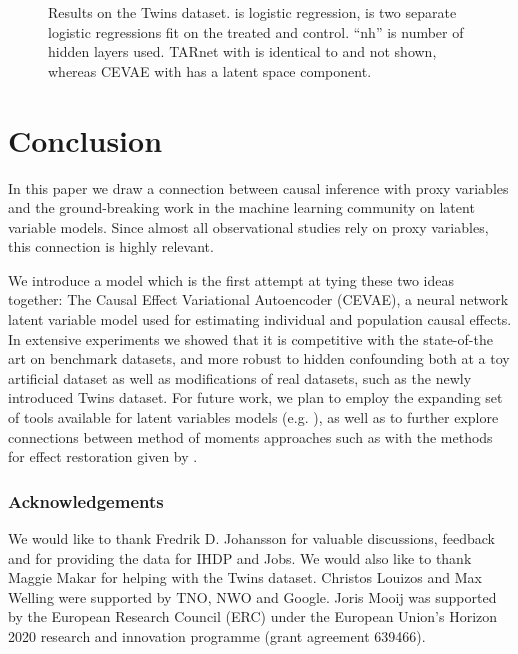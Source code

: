 \documentclass{article}
\begin{document}
\begin{figure*}[htb!]
\centering
\hspace*{\fill}\hfill {}
 \hspace*{\fill}\caption{Results on the Twins dataset.  is logistic regression,  is two separate logistic regressions fit on the treated and control. ``nh'' is number of hidden layers used. TARnet with  is identical to  and not shown, whereas CEVAE with  has a latent space component.}
 \label{fig:twins}
 \vskip -10pt
\end{figure*}
 
\section{Conclusion}
\vskip -10pt
In this paper we draw a connection between causal inference with proxy variables and the ground-breaking work in the machine learning community on latent variable models. Since almost all observational studies rely on proxy variables, this connection is highly relevant.

We introduce a model which is the first attempt at tying these two ideas together: The Causal Effect Variational Autoencoder (CEVAE), a neural network latent variable model used for estimating individual and population causal effects. In extensive experiments we showed that it is competitive with the state-of-the art on benchmark datasets, and more robust to hidden confounding both at a toy artificial dataset as well as modifications of real datasets, such as the newly introduced Twins dataset. 
For future work, we plan to employ the expanding set of tools available for latent variables models (e.g. \citet{kingma2016improving,tran2015variational,maaloe2016auxiliary,ranganath2016operator}), as well as to further explore connections between method of moments approaches such as \citet{anandkumar2014tensor} with the methods for effect restoration given by \citet{kuroki2014measurement,miao2016identifying}. 

 
\subsubsection*{Acknowledgements}
We would like to thank Fredrik D. Johansson for valuable discussions, feedback and for providing the data for IHDP and Jobs. We would also like to thank Maggie Makar for helping with the Twins dataset. Christos Louizos and Max Welling were supported by TNO, NWO and Google. Joris Mooij was supported by the European Research Council (ERC) under the European Union's Horizon 2020 research and innovation programme (grant agreement 639466).
\end{document}
